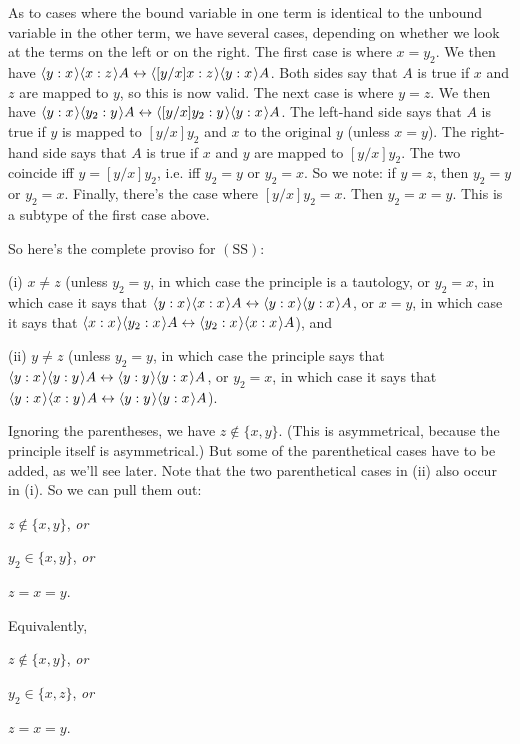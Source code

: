 \documentclass[11pt]{woarticle}
\theoremstyle{break}
\theoremstyle{nonumberplain}
\newcommand{\1}{\;\,|\;\,}
\renewcommand{\t}[1]{\ensuremath{\langle #1  \makebox[.2ex]{}\rangle}}
\newcommand{\T}[1]{\ensuremath{(\mathrm{ #1})}}
\begin{document}
{  As to cases where the bound variable in one term is identical to the
  unbound variable in the other term, we have several cases, depending
  on whether we look at the terms on the left or on the right. The
  first case is where $x=y_2$. We then have $\t{y:x}\t{x:z}A
  \leftrightarrow \t{[y/x]x:z}\t{y:x}A$. Both sides say that $A$ is
  true if $x$ and $z$ are mapped to $y$, so this is now valid. The
  next case is where $y=z$. We then have $\t{y:x}\t{y_2:y}A
  \leftrightarrow \t{[y/x]y_2:y}\t{y:x}A$. The left-hand side says
  that $A$ is true if $y$ is mapped to $[y/x]y_2$ and $x$ to the
  original $y$ (unless $x=y$). The right-hand side says that $A$ is
  true if $x$ and $y$ are mapped to $[y/x]y_2$. The two coincide iff
  $y=[y/x]y_2$, i.e. iff $y_2=y$ or $y_2=x$. So we note: if $y=z$,
  then $y_2=y$ or $y_2=x$. Finally, there's the case where $[y/x]y_2 =
  x$. Then $y_2=x=y$. This is a subtype of the first case above.

  So here's the complete proviso for \T{SS}:
  \begin{compactenum}
  \item[(i)] $x\not=z$ (unless $y_2=y$, in which case the principle is
    a tautology, or $y_2=x$, in which case it says that
    $\t{y:x}\t{x:x}A \leftrightarrow \t{y:x}\t{y:x}A$, or $x=y$, in
    which case it says that $\t{x:x}\t{y_2:x}A \leftrightarrow
    \t{y_2:x}\t{x:x}A$), and
  \item[(ii)] $y\not=z$ (unless $y_2=y$, in which case the principle
    says that $\t{y:x}\t{y:y}A \leftrightarrow \t{y:y}\t{y:x}A$, or
    $y_2=x$, in which case it says that $\t{y:x}\t{x:y}A
    \leftrightarrow \t{y:y}\t{y:x}A$).
  \end{compactenum}
  Ignoring the parentheses, we have $z\not\in\{x,y\}$. (This is
  asymmetrical, because the principle itself is asymmetrical.) But
  some of the parenthetical cases have to be added, as we'll see
  later. Note that the two parenthetical cases in (ii) also occur in
  (i). So we can pull them out:
  \begin{compactenum}
  \item $z\not\in\{x,y\}$, \emph{or}
  \item $y_2\in\{x,y\}$, \emph{or}
  \item $z=x=y$.
  \end{compactenum}
  Equivalently,
  \begin{compactenum}
  \item $z\not\in\{x,y\}$, \emph{or}
  \item $y_2\in \{x,z\}$, \emph{or}
  \item $z=x=y$.
  \end{compactenum}

}
\end{document}

